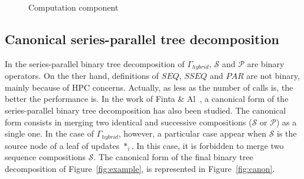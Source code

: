 \begin{figure}[h!]
\captionsetup[subfigure]{labelformat=empty}
\begin{center}
  \caption{Computation component}
\label{fig:control}
\end{center}
\end{figure}

\subsection{Canonical series-parallel tree decomposition}
In the series-parallel binary tree decomposition of $\Gamma_{hybrid}$, $\mathcal{S}$ and $\mathcal{P}$ are binary operators. On the ther hand, definitions of $SEQ$, $SSEQ$ and $PAR$ are not binary, mainly because of HPC concerns. Actually, as less as the number of calls is, the better the performance is. In the work of Finta \& Al~\cite{Finta:1996:SUS:235643.235649}, a canonical form of the series-parallel binary tree decomposition has also been studied. The canonical form consists in merging two identical and successive compositions ($\mathcal{S}$ or $\mathcal{P}$) as a single one. In the case of $\Gamma_{hybrid}$, however, a particular case appear when $\mathcal{S}$ is the source node of a leaf of updates $*_i$. In this case, it is forbidden to merge two sequence compositions $\mathcal{S}$. The canonical form of the final binary tree decomposition of Figure~\ref{fig:example}, is represented in Figure~\ref{fig:canon}.

